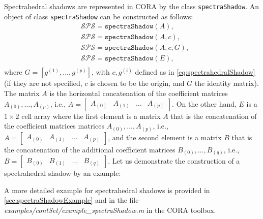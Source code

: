 Spectrahedral shadows are represented in CORA by the class \texttt{spectraShadow}. An object of class \texttt{spectraShadow} can be constructed as follows:
\begin{equation*}
	\begin{split}
		& \mathcal{SPS} = \texttt{spectraShadow}(A), \\
		& \mathcal{SPS} = \texttt{spectraShadow}(A,c), \\
		& \mathcal{SPS} = \texttt{spectraShadow}(A,c,G), \\
		& \mathcal{SPS} = \texttt{spectraShadow}(E), \\
	\end{split}
\end{equation*} 
where $G= [g^{(1)},\dots,g^{(p)}]$, with $c, g^{(i)}$ defined as in \eqref{eq:spectrahedralShadow} (if they are not specified, $c$ is chosen to be the origin, and $G$ the identity matrix). The matrix $A$ is the horizontal concatenation of the coefficient matrices $A_{(0)},\dots, A_{(p)}$, i.e., $A = \begin{bmatrix} A_{(0)} & A_{(1)} & \dots & A_{(p)}\end{bmatrix}$. On the other hand, $E$ is a $1\times 2$ cell array where the first element is a matrix $A$ that is the concatenation of the coefficient matrices matrices $A_{(0)},\dots, A_{(p)}$, i.e., $A = \begin{bmatrix} A_{(0)} & A_{(1)} & \dots & A_{(p)}\end{bmatrix}$, and the second element is a matrix $B$ that is the concatenation of the additional coefficient matrices $B_{(0)},\dots, B_{(q)}$, i.e., $B = \begin{bmatrix} B_{(0)} & B_{(1)} & \dots & B_{(q)}\end{bmatrix}$.
Let us demonstrate the construction of a spectrahedral shadow by an example:

\begin{center}
	\begin{minipage}[t]{0.5\textwidth}
		\vspace{20pt}
		\footnotesize
		
	\end{minipage}
	\begin{minipage}[t]{0.3\textwidth}
		\vspace{0pt}
		\centering
	\end{minipage}
\end{center}

A more detailed example for spectrahedral shadows is provided in \cref{sec:spectraShadowExample} and in the file \textit{examples/contSet/example\_spectraShadow.m} in the CORA toolbox.